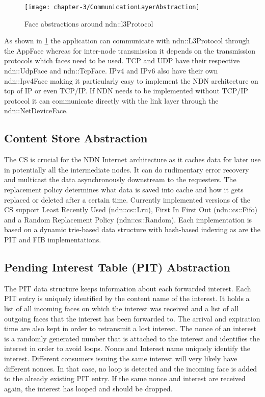 \vspace{5mm} %

\begin{figure}[H]
  \centering
  \texttt{[image: chapter-3/CommunicationLayerAbstraction]}
  \caption{Face abstractions around ndn::l3Protocol \cite{afanasyev12}}
  \label{fig:CommunicationLayerAbstraction}
\end{figure}

\vspace{5mm} %

As shown in \ref{fig:CommunicationLayerAbstraction} the application can communicate with ndn::L3Protocol through the AppFace whereas for inter-node transmission it depends on the transmission protocols which faces need to be used. TCP and UDP have their respective ndn::UdpFace and ndn::TcpFace. IPv4 and IPv6 also have their own ndn::Ipv4Face making it particularly easy to implement the NDN architecture on top of IP or even TCP/IP. If NDN needs to be implemented without TCP/IP protocol it can communicate directly with the link layer through the ndn::NetDeviceFace.

\subsection{Content Store Abstraction}

The CS is crucial for the NDN Internet architecture as it caches data for later use in potentially all the intermediate nodes. It can do rudimentary error recovery and multicast the data asynchronously downstream to the requesters. The replacement policy determines what data is saved into cache and how it gets replaced or deleted after a certain time. Currently implemented versions of the CS support Least Recently Used (ndn::cs::Lru), First In First Out (ndn::cs::Fifo) and a Random Replacement Policy (ndn::cs::Random). Each implementation is based on a dynamic trie-based data structure with hash-based indexing as are the PIT and FIB implementations.

\subsection{Pending Interest Table (PIT) Abstraction}

The PIT data structure keeps information about each forwarded interest. Each PIT entry is uniquely identified by the content name of the interest. It holds a list of all incoming faces on which the interest was received and a list of all outgoing faces that the interest has been forwarded to. The arrival and expiration time are also kept in order to retransmit a lost interest. The nonce of an interest is a randomly generated number that is attached to the interest and identifies the interest in order to avoid loops. Nonce and Interest name uniquely identify the interest. Different consumers issuing the same interest will very likely have different nonces. In that case, no loop is detected and the incoming face is added to the already existing PIT entry. If the same nonce and interest are received again, the interest has looped and should be dropped.

